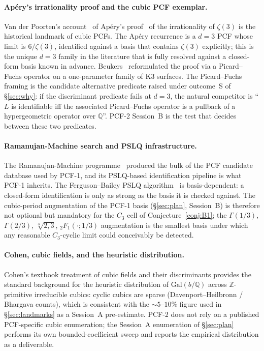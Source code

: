 \documentclass[11pt,a4paper]{article}
\theoremstyle{definition}
\theoremstyle{remark}
\newcommand{\Q}{\mathbb{Q}}
\newcommand{\Z}{\mathbb{Z}}
\newcommand{\Gal}{\mathrm{Gal}}
\begin{document}
\paragraph{Ap\'ery's irrationality proof and the cubic PCF
exemplar.}
Van der Poorten's account~\cite{vanderPoorten1979} of
Ap\'ery's proof~\cite{Apery1979} of the irrationality of $\zeta(3)$ is
the historical landmark of cubic PCFs. The Ap\'ery recurrence is a
$d=3$ PCF whose limit is $6/\zeta(3)$, identified against a basis
that contains $\zeta(3)$ explicitly; this is the unique $d=3$ family
in the literature that is fully resolved against a closed-form basis
known in advance. Beukers~\cite{Beukers1979} reformulated the proof
via a Picard--Fuchs operator on a one-parameter family of K3
surfaces. The Picard--Fuchs framing is the candidate alternative
predicate raised under outcome~S of \S\ref{sec:why}: if the
discriminant predicate fails at $d=3$, the natural competitor is
``$L$ is identifiable iff the associated Picard--Fuchs operator
is a pullback of a hypergeometric operator over $\Q$''. PCF-2
Session~B is the test that decides between these two predicates.

\paragraph{Ramanujan-Machine search and PSLQ infrastructure.}
The Ramanujan-Machine programme~\cite{Raayoni2021} produced the bulk of
the PCF candidate database used by PCF-1, and its PSLQ-based
identification pipeline is what PCF-1 inherits. The
Ferguson--Bailey PSLQ algorithm~\cite{FergusonBailey1992} is
basis-dependent: a closed-form identification is only as strong as the
basis it is checked against. The cubic-period augmentation of the
PCF-1 basis (\S\ref{sec:plan}, Session~B) is therefore not optional
but mandatory for the $C_{3}$ cell of Conjecture~\ref{conj:B1}; the
$\Gamma(1/3)$, $\Gamma(2/3)$, $\sqrt[3]{2,3}$, ${}_{2}F_{1}(\cdot;1/3)$
augmentation is the smallest basis under which any reasonable
$C_{3}$-cyclic limit could conceivably be detected.

\paragraph{Cohen, cubic fields, and the heuristic distribution.}
Cohen's textbook treatment of cubic fields and their discriminants
\cite{Cohen2007} provides the standard background for the heuristic
distribution of $\Gal(b/\Q)$ across $\Z$-primitive irreducible cubics:
cyclic cubics are sparse (Davenport--Heilbronn / Bhargava counts),
which is consistent with the $\sim 5$--$10\%$ figure used in
\S\ref{sec:landmarks} as a Session~A pre-estimate. PCF-2 does not
rely on a published PCF-specific cubic enumeration; the Session~A
enumeration of \S\ref{sec:plan} performs its own bounded-coefficient
sweep and reports the empirical distribution as a deliverable.
\end{document}

